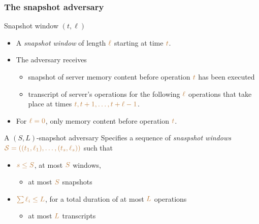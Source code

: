 \documentclass[]{beamer}
\newcommand{\calS}{\mathcal{S}}
\begin{document}
\begin{frame}
\frametitle{The snapshot adversary}

\begin{block}{Snapshot window $(t,\ell)$}

\begin{itemize}
\item A {\em\color{blue} snapshot window} of length $\color{brown}\ell$ starting at time $\color{brown}t$.
\item The adversary receives
    \begin{itemize}
        \item {\color{magenta} snapshot} of server {\color{magenta} memory content}
            before operation $\color{brown}t$ has been executed
        \item {\color{magenta} transcript} of {\color{magenta} server's operations} for the following
            $\color{brown}\ell$ operations that take place at times 
            $\color{brown} t,t+1,\ldots,t+\ell-1$.
    \end{itemize}
\item For $\color{brown}\ell=0$, only memory content before operation $\color{brown}t$.
\end{itemize}
\end{block}
\begin{block}{A $(S,L)$-snapshot adversary}
Specifies a sequence of {\em\color{blue} snaspshot windows}
$\color{brown}\calS=((t_1,\ell_1),\ldots,(t_s,\ell_s))$ such that 

\begin{itemize}
\item $\color{brown}s\leq S$, at most $\color{brown}S$ {\color{brown} windows}, 
    \begin{itemize}\item at most $\color{brown}S$ {\color{blue} snapshots}\end{itemize}
\item $\color{brown}\sum \ell_i\leq L$, for a total duration of at most $\color{brown}L$ operations
    \begin{itemize}\item at most $\color{brown}L$ {\color{blue} transcripts}\end{itemize}
\end{itemize}
\end{block}
\end{frame}
\end{document}
